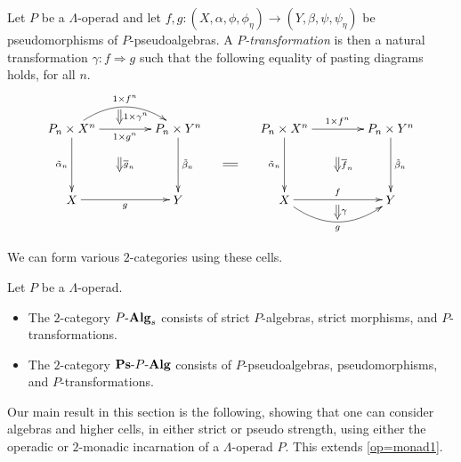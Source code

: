 \begin{Defi}
Let $P$ be a $\Lambda$-operad and let $f, g \colon (X, \alpha, \phi, \phi_\eta) \rightarrow (Y, \beta, \psi, \psi_\eta)$ be pseudomorphisms of $P$-pseudoalgebras. A \textit{$P$-transformation} is then a natural transformation $\gamma \colon f \Rightarrow g$ such that the following equality of pasting diagrams holds, for all $n$.
    \[
        \xy
            (0,0)*+{P_n \times X^n}="00";
            (30,0)*+{P_n \times Y^n}="10";
            (0,-20)*+{X}="01";
            (30,-20)*+{Y}="11";
            {\ar@/^1.5pc/^{1 \times f^n} "00" ; "10"};
            {\ar_{1 \times g^n} "00" ; "10"};
            {\ar^{\tilde{\beta}_n} "10" ; "11"};
            {\ar_{\tilde{\alpha}_n} "00" ; "01"};
            {\ar_{g} "01" ; "11"};
            {\ar@{=>}^{1 \times \gamma^n} (13.5,5.5) ; (13.5,1.5)};
            {\ar@{=>}^{\overline{g}_n} (13.5,-8) ; (13.5,-12)};
            (60,0)*+{P_n \times X^n}="x00";
            (90,0)*+{P_n \times Y^n}="x10";
            (60,-20)*+{X}="x01";
            (90,-20)*+{Y}="x11";
            {\ar^{1 \times f^n} "x00" ; "x10"};
            {\ar^{\tilde{\beta}_n} "x10" ; "x11"};
            {\ar_{\tilde{\alpha}_n} "x00" ; "x01"};
            {\ar^{f} "x01" ; "x11"};
            {\ar@/_1.5pc/_{g} "x01" ; "x11"};
            {\ar@{=>}^{\gamma} (75,-21.5) ; (75,-25.5)};
            {\ar@{=>}^{\overline{f}_n} (75,-8) ; (75,-12)};
            {\ar@{=} (42.75,-10) ; (46.75,-10)};
        \endxy
    \]
\end{Defi}

We can form various $2$-categories using these cells.

\begin{Defi}
Let $P$ be a $\Lambda$-operad.
\begin{itemize}
\item The $2$-category $P\mbox{-}\mathbf{Alg}_{s}$ consists of strict $P$-algebras, strict morphisms, and $P$-transformations.
\item The $2$-category $\mathbf{Ps}\mbox{-}P\mbox{-}\mathbf{Alg}$ consists of $P$-pseudoalgebras, pseudomorphisms, and $P$-transformations.
\end{itemize}
\end{Defi}

Our main result in this section is the following, showing that one can consider algebras and higher cells, in either strict or pseudo strength, using either the operadic or $2$-monadic incarnation of a $\Lambda$-operad $P$. This extends \cref{op=monad1}.


